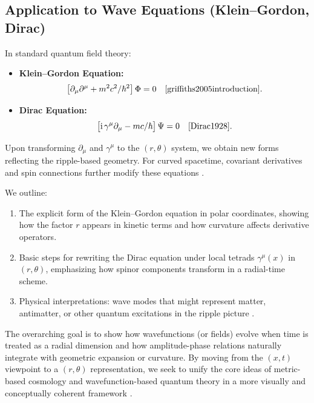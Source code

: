 \documentclass{article}
\begin{document}
\subsection{Application to Wave Equations (Klein--Gordon, Dirac)}
\label{subsec:wave-equations}
In standard quantum field theory:
\begin{itemize}
  \item \textbf{Klein--Gordon Equation:} 
    \[
      \bigl[\partial_\mu\partial^\mu + m^2c^2/\hbar^2\bigr]\,\Phi = 0
      \quad \cite{griffiths2005introduction}.
    \]
  \item \textbf{Dirac Equation:}
    \[
      \bigl[\mathrm{i}\,\gamma^\mu \partial_\mu - m c/\hbar\bigr]\,\Psi = 0
      \quad \cite{Dirac1928}.
    \]
\end{itemize}
Upon transforming \(\partial_\mu\) and \(\gamma^\mu\) to the 
\((r,\theta)\) system, we obtain new forms reflecting the ripple-based 
geometry. For curved spacetime, covariant derivatives and spin connections 
further modify these equations \cite{misner1973}. 

We outline:
\begin{enumerate}
  \item The explicit form of the Klein--Gordon equation in polar coordinates, 
        showing how the factor \(r\) appears in kinetic terms and how 
        curvature affects derivative operators.
  \item Basic steps for rewriting the Dirac equation under local tetrads 
        \(\gamma^\mu(x)\) in \((r,\theta)\), emphasizing how spinor components 
        transform in a radial-time scheme.
  \item Physical interpretations: wave modes that might represent matter, 
        antimatter, or other quantum excitations in the ripple picture 
        \cite{everett1957, dewitt1971}.
\end{enumerate}

The overarching goal is to show how wavefunctions (or fields) evolve when time is 
treated as a radial dimension and how amplitude-phase relations naturally 
integrate with geometric expansion or curvature. By moving from the 
\((x,t)\) viewpoint to a \((r,\theta)\) representation, we seek to unify 
the core ideas of metric-based cosmology and wavefunction-based quantum theory 
in a more visually and conceptually coherent framework \cite{nielsenchuang2000, penrose2004}.

\end{document}
